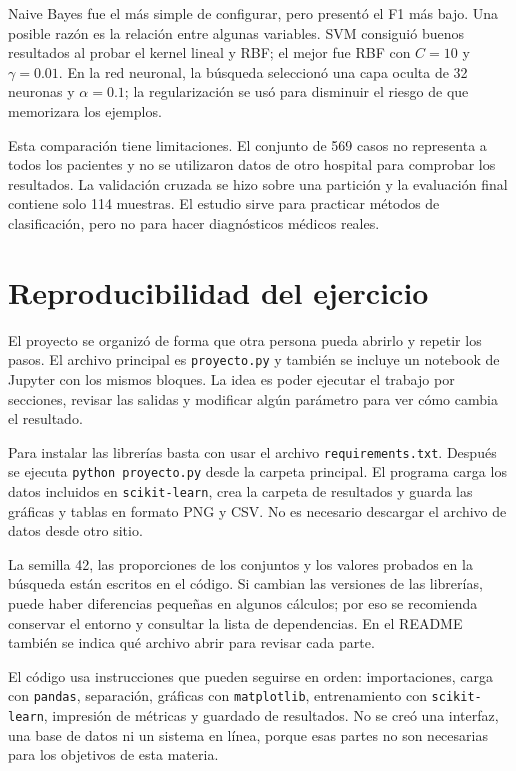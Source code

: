 \documentclass[conference]{IEEEtran}
\begin{document}
Naive Bayes fue el más simple de configurar, pero presentó el F1 más bajo. Una posible razón es la relación entre algunas variables. SVM consiguió buenos resultados al probar el kernel lineal y RBF; el mejor fue RBF con $C=10$ y $\gamma=0.01$. En la red neuronal, la búsqueda seleccionó una capa oculta de 32 neuronas y $\alpha=0.1$; la regularización se usó para disminuir el riesgo de que memorizara los ejemplos.

Esta comparación tiene limitaciones. El conjunto de 569 casos no representa a todos los pacientes y no se utilizaron datos de otro hospital para comprobar los resultados. La validación cruzada se hizo sobre una partición y la evaluación final contiene solo 114 muestras. El estudio sirve para practicar métodos de clasificación, pero no para hacer diagnósticos médicos reales.


\section{Reproducibilidad del ejercicio}
El proyecto se organizó de forma que otra persona pueda abrirlo y repetir los pasos. El archivo principal es \texttt{proyecto.py} y también se incluye un notebook de Jupyter con los mismos bloques. La idea es poder ejecutar el trabajo por secciones, revisar las salidas y modificar algún parámetro para ver cómo cambia el resultado.

Para instalar las librerías basta con usar el archivo \texttt{requirements.txt}. Después se ejecuta \texttt{python proyecto.py} desde la carpeta principal. El programa carga los datos incluidos en \texttt{scikit-learn}, crea la carpeta de resultados y guarda las gráficas y tablas en formato PNG y CSV. No es necesario descargar el archivo de datos desde otro sitio.

La semilla 42, las proporciones de los conjuntos y los valores probados en la búsqueda están escritos en el código. Si cambian las versiones de las librerías, puede haber diferencias pequeñas en algunos cálculos; por eso se recomienda conservar el entorno y consultar la lista de dependencias. En el README también se indica qué archivo abrir para revisar cada parte.

El código usa instrucciones que pueden seguirse en orden: importaciones, carga con \texttt{pandas}, separación, gráficas con \texttt{matplotlib}, entrenamiento con \texttt{scikit-learn}, impresión de métricas y guardado de resultados. No se creó una interfaz, una base de datos ni un sistema en línea, porque esas partes no son necesarias para los objetivos de esta materia.
\end{document}
